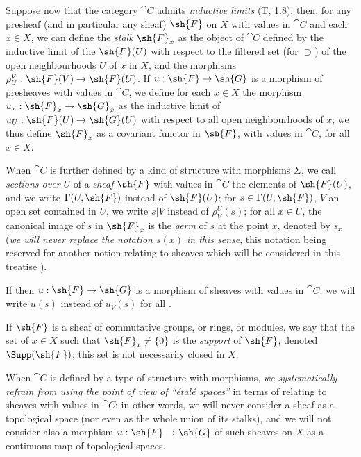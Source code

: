 \begin{env}[3.1.6]
\label{0.3.1.6}
Suppose now that the category $\cat{C}$ admits \emph{inductive limits} (T, 1.8);
then, for any presheaf (and in particular any sheaf) $\sh{F}$ on $X$ with values
in $\cat{C}$ and each $x\in X$, we can define the \emph{stalk} $\sh{F}_x$ as the
object of $\cat{C}$ defined by the inductive limit of the $\sh{F}(U)$ with respect to
the filtered set (for $\supset$) of the open neighbourhoods $U$ of $x$ in $X$,
and the morphisms $\rho_U^V:\sh{F}(V)\to\sh{F}(U)$. If $u:\sh{F}\to\sh{G}$ is a
morphism of presheaves with values in $\cat{C}$, we define for each $x\in X$ the
morphism $u_x:\sh{F}_x\to\sh{G}_x$ as the inductive limit of
$u_U:\sh{F}(U)\to\sh{G}(U)$ with respect to all open neighbourhoods of $x$; we
thus define $\sh{F}_x$ as a covariant functor in $\sh{F}$, with values in $\cat{C}$,
for all $x\in X$.

When $\cat{C}$ is further defined by a kind of structure with morphisms $\Sigma$, we
call \emph{sections over $U$} of a \emph{sheaf} $\sh{F}$ with values in $\cat{C}$ the
elements of $\sh{F}(U)$, and we write $\Gamma(U,\sh{F})$ instead of $\sh{F}(U)$;
for $s\in\Gamma(U,\sh{F})$, $V$ an open set contained in $U$, we write $s|V$
instead of $\rho_V^U(s)$; for all $x\in U$, the canonical image of $s$ in
$\sh{F}_x$ is the \emph{germ} of $s$ at the point $x$, denoted by $s_x$
(\emph{we will never replace the notation $s(x)$ in this sense}, this notation
being reserved for another notion relating to sheaves which will be considered
in this treatise ).

If then $u:\sh{F}\to\sh{G}$ is a morphism of sheaves with values in $\cat{C}$, we
will write $u(s)$ instead of $u_V(s)$ for all .

If $\sh{F}$ is a sheaf of commutative groups, or rings, or modules, we say that
the set of $x\in X$ such that $\sh{F}_x\neq\{0\}$ is the \emph{support} of
$\sh{F}$, denoted $\Supp(\sh{F})$; this set is not necessarily closed in $X$.

When $\cat{C}$ is defined by a type of structure with morphisms, \emph{we
systematically refrain from using the point of view of ``\'etal\'e spaces''} in
terms of relating to sheaves with values in $\cat{C}$; in other words, we will never
consider a sheaf as a topological space (nor even as the whole union of its
stalks), and we will not consider also a morphism $u:\sh{F}\to\sh{G}$ of such
sheaves on $X$ as a continuous map of topological spaces.
\end{env}

